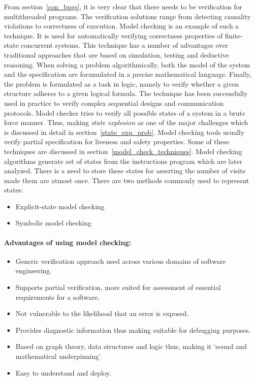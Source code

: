 From section~\ref{con_bugs}, it is very clear that there needs to be verification for multithreaded programs. 
The verification solutions range from detecting causality violations to correctness of execution\cite{d2008survey}. 
Model checking is an example of such a technique. 
It is used for automatically verifying correctness properties of finite-state concurrent systems\cite{model_check}\cite{berard2013systems}. 
This technique has a number of advantages over traditional approaches that are based on simulation, testing and deductive reasoning. 
When solving a problem algorithmically, both the model of the system and the specification are forumulated in a precise mathematical language. 
Finally, the problem is formulated as a task in logic, namely to verify whether a given structure adheres to a given logical formula.  
The technique has been successfully used in practice to verify complex sequential designs and communication protocols\cite{model_check}. 
Model checker tries to verify all possible states of a system in a brute force manner\cite{model_checking_principles}. 
Thus, making \emph{state explosion} as one of the major challenges which is discussed in detail in section~\ref{state_exp_prob}.  
Model checking tools usually verify partial specification for liveness and safety properties\cite{d2008survey}. 
Some of these techniques are discussed in section~\ref{model_check_techniques}. 
Model checking algorithms generate set of states from the instructions program which are later analyzed. 
There is a need to store these states for asserting the number of visits made them are atmost once. 
There are two methods commonly used to represent states:
\begin{itemize}
\item	Explicit-state model checking
\item	Symbolic model checking
\end{itemize}

\paragraph{Advantages of using model checking:} 
\begin{itemize}
\item	Generic verification approach used across various domains of software engineering.
\item 	Supports partial verification, more suited for assessment of essential requirements for a software.
\item 	Not vulnerable to the likelihood that an error is exposed. 
\item  	Provides diagnostic information thus making suitable for debugging purposes. 
\item	Based on graph theory, data structures and logic thus, making it `sound and mathematical underpinning'. 
\item 	Easy to understand and deploy. 

\end{itemize}

